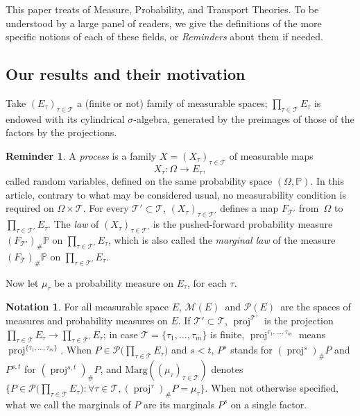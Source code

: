 \documentclass[11pt]{article}
\theoremstyle{plain}
\theoremstyle{definition}
\newtheorem{notation}[them]{Notation} %
\newtheorem{reminder}[them]{Reminder}
\newcommand{\espace}{E}
\newcommand{\Tt}{{\mathcal T}}
\renewcommand{\P}{\mathbb{P}}
\newcommand{\p}{\mathcal{P}}
\newcommand{\m}{\mathcal{M}}
\newcommand{\ma}{\mathrm{Marg}}
\newcommand{\pr}{\operatorname{proj}}
\begin{document}
This paper treats of Measure, Probability, and Transport Theories. To be understood by a large panel of readers, we give the definitions of the more specific notions of each of these fields, or \emph{Reminders} about them if needed.

\subsection{Our results and their motivation}\label{subsec:resultats}

Take $(\espace_\tau)_{\tau\in\Tt}$ a (finite or not) family of measurable spaces; $\prod_{\tau\in\Tt}\espace_\tau$ is endowed with its cylindrical $\sigma$-algebra, generated by the preimages of those of the factors by the projections.

\begin{reminder}\label{reminder:process}
A \emph{process}
is a family $X=(X_\tau)_{\tau\in\Tt}$ of measurable maps
\[
X_\tau:\Omega\to \espace_\tau,
\]
called random variables, defined on the same probability space $(\Omega,\P)$. In this article, contrary to what may be considered usual, no measurability condition is required on $\Omega\times \Tt$. For every $\Tt'\subset \Tt$, $(X_\tau)_{\tau\in\Tt'}$ defines a map $F_{\Tt'}$ from~$\Omega$ to $\prod_{\tau\in\Tt'}\espace_\tau$. The \emph{law} of $(X_\tau)_{\tau\in\Tt'}$ is the pushed-forward probability measure $(F_{\Tt'})_\#\P$ on $\prod_{\tau\in\Tt'}\espace_\tau$, which is also called the \emph{marginal law} of the measure $(F_{\Tt})_\#\P$ on $\prod_{\tau\in\Tt'}\espace_\tau$. \end{reminder}

Now let $\mu_\tau$ be a probability measure on $E_\tau$, for each $\tau$.

\begin{notation}\label{notation:marg} For all measurable space $E$, $\m(E)$\ and $\p(E)$\ are the spaces of measures and probability measures on $E$. If $\Tt'\subset\Tt$, $\pr^{\Tt'}$ is the projection $\prod_{\tau\in\Tt}E_\tau\to\prod_{\tau\in\Tt'}E_\tau$; in case $\Tt=\{\tau_1,\ldots,\tau_m\}$ is finite, $\pr^{\tau_1,\ldots,\tau_m}$ means $\pr^{\{\tau_1,\ldots,\tau_m\}}$. When $P\in\p\bigl(\prod_{\tau\in\Tt}\espace_\tau\bigr)$ and $s<t$, $P^s$ stands for $(\pr^{s})_\#P$ and $P^{s,t}$ for $(\pr^{s,t})_\#P$, and $\ma((\mu_\tau)_{\tau\in\Tt})$ denotes $\{P\in\p\bigl(\prod_{\tau\in\Tt}\espace_\tau\bigr):\forall\tau\in\Tt,(\pr^\tau)_\#P=\mu_\tau\}$. When not otherwise specified, what we call the marginals of $P$ are its marginals $P^s$ on a single factor.
\end{notation}
\end{document}
